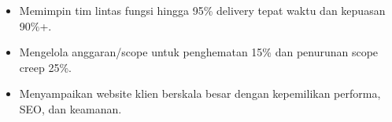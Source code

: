 \vspace{4pt}
\begin{itemize}
  \item Memimpin tim lintas fungsi hingga 95\% delivery tepat waktu dan kepuasan 90\%+.
  \item Mengelola anggaran/scope untuk penghematan 15\% dan penurunan scope creep 25\%.
\end{itemize}
\vspace{4pt}
\begin{itemize}
  \item Menyampaikan website klien berskala besar dengan kepemilikan performa, SEO, dan keamanan.
\end{itemize}